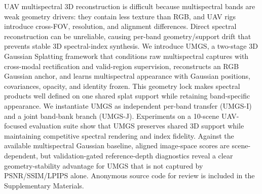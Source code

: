 UAV multispectral 3D reconstruction is difficult because multispectral bands are weak geometry drivers: they contain less texture than RGB, and UAV rigs introduce cross-FOV, resolution, and alignment differences. Direct spectral reconstruction can be unreliable, causing per-band geometry/support drift that prevents stable 3D spectral-index synthesis. We introduce UMGS, a two-stage 3D Gaussian Splatting framework that conditions raw multispectral captures with cross-modal rectification and valid-region supervision, reconstructs an RGB Gaussian anchor, and learns multispectral appearance with Gaussian positions, covariances, opacity, and identity frozen. This geometry lock makes spectral products well defined on one shared splat support while retaining band-specific appearance. We instantiate UMGS as independent per-band transfer (UMGS-I) and a joint band-bank branch (UMGS-J). Experiments on a 10-scene UAV-focused evaluation suite show that UMGS preserves shared 3D support while maintaining competitive spectral rendering and index fidelity. Against the available multispectral Gaussian baseline, aligned image-space scores are scene-dependent, but validation-gated reference-depth diagnostics reveal a clear geometry-stability advantage for UMGS that is not captured by PSNR/SSIM/LPIPS alone. Anonymous source code for review is included in the Supplementary Materials.
